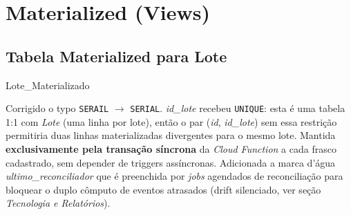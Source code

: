 \newpage
\section{Materialized (Views)}
\subsection{Tabela Materialized para Lote}
\begin{entidade}{Lote\_Materializado}
\end{entidade}
\begin{explicacao}
Corrigido o typo \texttt{SERAIL} $\rightarrow$ \texttt{SERIAL}. \textit{id\_lote} recebeu \texttt{UNIQUE}: esta é uma tabela 1:1 com \textit{Lote} (uma linha por lote), então o par (\textit{id}, \textit{id\_lote}) sem essa restrição permitiria duas linhas materializadas divergentes para o mesmo lote. Mantida \textbf{exclusivamente pela transação síncrona} da \textit{Cloud Function} a cada frasco cadastrado, sem depender de triggers assíncronas. Adicionada a marca d'água \textit{ultimo\_reconciliador} que é preenchida por \textit{jobs} agendados de reconciliação para bloquear o duplo cômputo de eventos atrasados (drift silenciado, ver seção \textit{Tecnologia e Relatórios}).
\end{explicacao}

